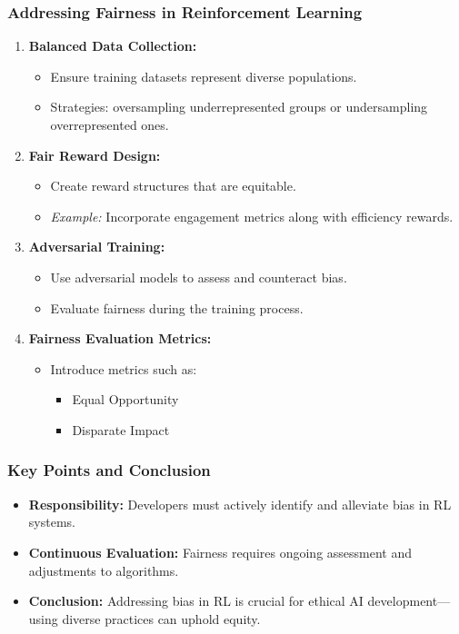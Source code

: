 \documentclass[aspectratio=169]{beamer}
\begin{document}
\begin{frame}[fragile]
    \frametitle{Addressing Fairness in Reinforcement Learning}

    \begin{enumerate}
        \item \textbf{Balanced Data Collection:}
            \begin{itemize}
                \item Ensure training datasets represent diverse populations.
                \item Strategies: oversampling underrepresented groups or undersampling overrepresented ones.
            \end{itemize}

        \item \textbf{Fair Reward Design:}
            \begin{itemize}
                \item Create reward structures that are equitable.
                \item \textit{Example:} Incorporate engagement metrics along with efficiency rewards.
            \end{itemize}

        \item \textbf{Adversarial Training:}
            \begin{itemize}
                \item Use adversarial models to assess and counteract bias.
                \item Evaluate fairness during the training process.
            \end{itemize}

        \item \textbf{Fairness Evaluation Metrics:}
            \begin{itemize}
                \item Introduce metrics such as:
                \begin{itemize}
                    \item Equal Opportunity
                    \item Disparate Impact
                \end{itemize}
            \end{itemize}
    \end{enumerate}
\end{frame}

\begin{frame}[fragile]
    \frametitle{Key Points and Conclusion}

    \begin{itemize}
        \item \textbf{Responsibility:} Developers must actively identify and alleviate bias in RL systems.
        \item \textbf{Continuous Evaluation:} Fairness requires ongoing assessment and adjustments to algorithms.
        \item \textbf{Conclusion:} Addressing bias in RL is crucial for ethical AI development—using diverse practices can uphold equity.
    \end{itemize}
\end{frame}
\end{document}
